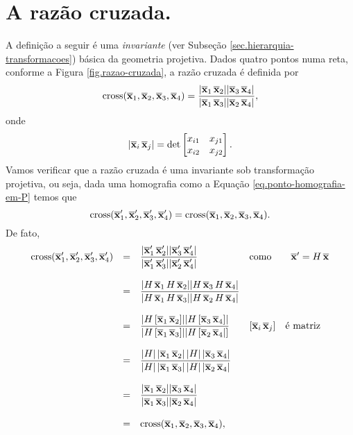 \section*{A razão cruzada.}
A definição a seguir é uma \textit{invariante} (ver Subseção \ref{sec.hierarquia-transformacoes}) básica da geometria projetiva. Dados quatro pontos numa reta, conforme a Figura \ref{fig.razao-cruzada}, a razão cruzada é definida por 
\begin{equation*}
\text{cross}(\overline{\mathbf{x}}_1,\overline{\mathbf{x}}_2,\overline{\mathbf{x}}_3,\overline{\mathbf{x}}_4)=\frac{|\overline{\mathbf{x}}_1\,\overline{\mathbf{x}}_2||\overline{\mathbf{x}}_3\,\overline{\mathbf{x}}_4|}{|\overline{\mathbf{x}}_1\,\overline{\mathbf{x}}_3||\overline{\mathbf{x}}_2\,\overline{\mathbf{x}}_4|},
\end{equation*}
onde 
\begin{equation*}
|\overline{\mathbf{x}}_i\,\overline{\mathbf{x}}_j|=
\text{det}
\begin{bmatrix}
x_{i1}&x_{j1}\\
x_{i2}&x_{j2}
\end{bmatrix}.
\end{equation*}
Vamos verificar que a razão cruzada é uma invariante sob transformação projetiva, ou seja, dada uma homografia como a Equação \ref{eq.ponto-homografia-em-P} temos que 
\begin{equation}\label{eq.invariante-cross}
\text{cross}(\overline{\mathbf{x}}'_1,\overline{\mathbf{x}}'_2,\overline{\mathbf{x}}'_3,\overline{\mathbf{x}}'_4)=\text{cross}(\overline{\mathbf{x}}_1,\overline{\mathbf{x}}_2,\overline{\mathbf{x}}_3,\overline{\mathbf{x}}_4).
\end{equation}
De fato,
\begin{equation*}
\begin{array}{rcll}
\text{cross}(\overline{\mathbf{x}}'_1,\overline{\mathbf{x}}'_2,\overline{\mathbf{x}}'_3,\overline{\mathbf{x}}'_4)&=&\displaystyle\frac{|\overline{\mathbf{x}}'_1\,\overline{\mathbf{x}}'_2||\overline{\mathbf{x}}'_3\,\overline{\mathbf{x}}'_4|}{|\overline{\mathbf{x}}'_1\,\overline{\mathbf{x}}'_3||\overline{\mathbf{x}}'_2\,\overline{\mathbf{x}}'_4|}&\text{como}\qquad\overline{\mathbf{x}}'=H\,\overline{\mathbf{x}}\\\\
&=&
\displaystyle\frac{|H\,\overline{\mathbf{x}}_1\,H\,\overline{\mathbf{x}}_2||H\,\overline{\mathbf{x}}_3\,H\,\overline{\mathbf{x}}_4|}{|H\,\overline{\mathbf{x}}_1\,H\,\overline{\mathbf{x}}_3||H\,\overline{\mathbf{x}}_2\,H\,\overline{\mathbf{x}}_4|}&\\\\
&=&
\displaystyle\frac{|H\,[\overline{\mathbf{x}}_1\,\overline{\mathbf{x}}_2]||H\,[\overline{\mathbf{x}}_3\,\overline{\mathbf{x}}_4]|}{|H\,[\overline{\mathbf{x}}_1\,\overline{\mathbf{x}}_3]||H\,[\overline{\mathbf{x}}_2\,\overline{\mathbf{x}}_4|]}&[\overline{\mathbf{x}}_i\,\overline{\mathbf{x}}_j]\quad\text{é matriz}      \\\\
&=&
\displaystyle\frac{|H|\,|\overline{\mathbf{x}}_1\,\overline{\mathbf{x}}_2|\,|H|\,|\overline{\mathbf{x}}_3\,\overline{\mathbf{x}}_4|}{|H|\,|\overline{\mathbf{x}}_1\,\overline{\mathbf{x}}_3|\,|H|\,|\overline{\mathbf{x}}_2\,\overline{\mathbf{x}}_4|}&\\\\
&=&
\displaystyle\frac{|\overline{\mathbf{x}}_1\,\overline{\mathbf{x}}_2||\overline{\mathbf{x}}_3\,\overline{\mathbf{x}}_4|}{|\overline{\mathbf{x}}_1\,\overline{\mathbf{x}}_3||\overline{\mathbf{x}}_2\,\overline{\mathbf{x}}_4|}&\\\\
&=&
\text{cross}(\overline{\mathbf{x}}_1,\overline{\mathbf{x}}_2,\overline{\mathbf{x}}_3,\overline{\mathbf{x}}_4),
\end{array}
\end{equation*}
